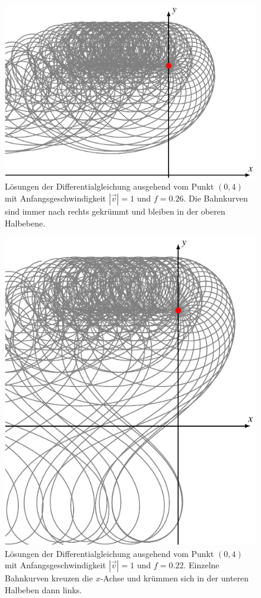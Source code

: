 \begin{figure}
\centering
\includegraphics{chapters/1/stream.pdf}
\caption{
Lösungen der Differentialgleichung ausgehend vom Punkt $(0,4)$
mit Anfangsgeschwindigkeit $|\vec{v}|=1$ und $f=0.26$.
Die Bahnkurven sind immer nach rechts gekrümmt und bleiben in der
oberen Halbebene.
\label{skript:stream-graph}}
\end{figure}

\begin{figure}
\centering
\includegraphics{chapters/1/cross.pdf}
\caption{
Lösungen der Differentialgleichung ausgehend vom Punkt $(0,4)$
mit Anfangsgeschwindigkeit $|\vec{v}|=1$ und $f=0.22$.
Einzelne Bahnkurven kreuzen die $x$-Achse und krümmen sich in der unteren
Halbeben dann links.
\label{skript:cross-graph}}
\end{figure}

